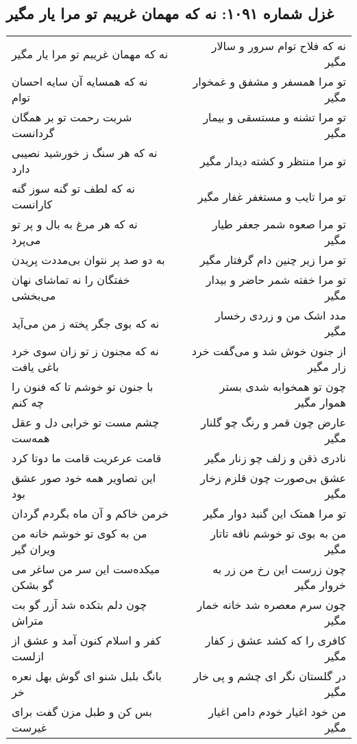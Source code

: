 \begin{center}
\section*{غزل شماره ۱۰۹۱: نه که مهمان غریبم تو مرا یار مگیر}
\label{sec:1091}
\begin{longtable}{l p{0.5cm} r}
نه که مهمان غریبم تو مرا یار مگیر
&&
نه که فلاح توام سرور و سالار مگیر
\\
نه که همسایه آن سایه احسان توام
&&
تو مرا همسفر و مشفق و غمخوار مگیر
\\
شربت رحمت تو بر همگان گردانست
&&
تو مرا تشنه و مستسقی و بیمار مگیر
\\
نه که هر سنگ ز خورشید نصیبی دارد
&&
تو مرا منتظر و کشته دیدار مگیر
\\
نه که لطف تو گنه سوز گنه کارانست
&&
تو مرا تایب و مستغفر غفار مگیر
\\
نه که هر مرغ به بال و پر تو می‌پرد
&&
تو مرا صعوه شمر جعفر طیار مگیر
\\
به دو صد پر نتوان بی‌مددت پریدن
&&
تو مرا زیر چنین دام گرفتار مگیر
\\
خفتگان را نه تماشای نهان می‌بخشی
&&
تو مرا خفته شمر حاضر و بیدار مگیر
\\
نه که بوی جگر پخته ز من می‌آید
&&
مدد اشک من و زردی رخسار مگیر
\\
نه که مجنون ز تو زان سوی خرد باغی یافت
&&
از جنون خوش شد و می‌گفت خرد زار مگیر
\\
با جنون تو خوشم تا که فنون را چه کنم
&&
چون تو همخوابه شدی بستر هموار مگیر
\\
چشم مست تو خرابی دل و عقل همه‌ست
&&
عارض چون قمر و رنگ چو گلنار مگیر
\\
قامت عرعریت قامت ما دوتا کرد
&&
نادری ذقن و زلف چو زنار مگیر
\\
این تصاویر همه خود صور عشق بود
&&
عشق بی‌صورت چون قلزم زخار مگیر
\\
خرمن خاکم و آن ماه بگردم گردان
&&
تو مرا همتک این گنبد دوار مگیر
\\
من به کوی تو خوشم خانه من ویران گیر
&&
من به بوی تو خوشم نافه تاتار مگیر
\\
میکده‌ست این سر من ساغر می گو بشکن
&&
چون زرست این رخ من زر به خروار مگیر
\\
چون دلم بتکده شد آزر گو بت متراش
&&
چون سرم معصره شد خانه خمار مگیر
\\
کفر و اسلام کنون آمد و عشق از ازلست
&&
کافری را که کشد عشق ز کفار مگیر
\\
بانگ بلبل شنو ای گوش بهل نعره خر
&&
در گلستان نگر ای چشم و پی خار مگیر
\\
بس کن و طبل مزن گفت برای غیرست
&&
من خود اغیار خودم دامن اغیار مگیر
\\
\end{longtable}
\end{center}
